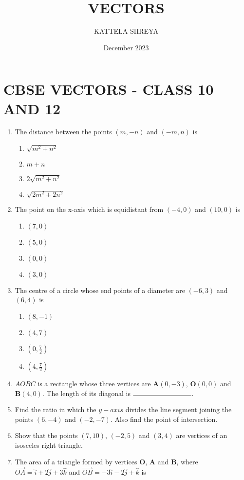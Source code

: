 \documentclass[12pt,-letter paper]{article}
\title{VECTORS}
\author{KATTELA SHREYA}
\date{December 2023}
\let\vec\mathbf{}
\let\vec\mathbf{}
\providecommand{\brak}[1]{\ensuremath{\left(#1\right)}}
\begin{document}
             
\maketitle
\section*{CBSE VECTORS - CLASS 10 AND 12}
\begin{enumerate}
\item The distance between the points $\brak{m,-n}$ and $\brak{-m, n}$ is
\begin{enumerate}
\item $\sqrt{m^{2} + n^{2}}$
\item $ m+n $
\item $ 2\sqrt{m^{2} + n^{2}}$
\item $\sqrt{2m^{2} + 2n^{2}}$
\end{enumerate}
\item The point on the x-axis which is equidistant from $\brak{-4,0}$ and $\brak{10,0}$ is
\begin{enumerate}             
\item $\brak{7,0}$
\item $\brak{5,0}$              
\item $\brak{0,0}$
\item $\brak{3,0}$
\end{enumerate}
\item The centre of a circle whose end points of a diameter are $\brak{-6,3}$ and $\brak{6,4}$ is
\begin{enumerate}
\item $\brak{8,-1}$
\item $\brak{4,7}$
\item $\brak{0,\frac{7}{2}}$
\item $\brak{4,\frac{7}{2}}$
\end{enumerate}
\item $AOBC$ is a rectangle whose three vertices are $\vec{A}\brak{0,-3}$, $\vec{O}\brak{0,0}$ and $\vec{B}\brak{4,0}$. The length of its diagonal is $\rule{3cm}{0.15mm}$.
\item Find the ratio in which the $y-axis$ divides the line segment joining the points $\brak{6,-4}$ and $\brak{-2, -7}$. Also find the point of intersection.
\item Show that the points $\brak{7, 10}$, $\brak{-2, 5}$ and $\brak{3, 4}$ are vertices of an isosceles right triangle.
\item The area of a triangle formed by vertices $\vec{O}$, $\vec{A}$ and $\vec{B}$, where $\overrightarrow{OA}= \hat{i}+2 \hat{j}+3\hat{k}$ and $\overrightarrow{OB}= -3\hat{i} - 2\hat{j} + \hat{k}$ is

\end{enumerate}
\end{document}
